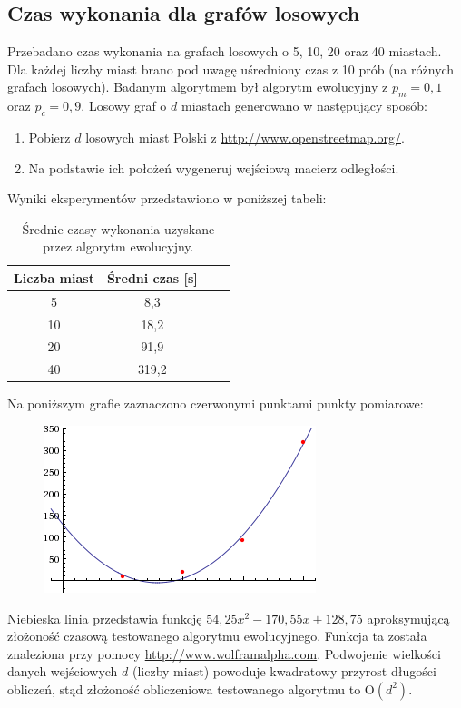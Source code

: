 \documentclass[12pt, a4paper]{article}
\begin{document}
\subsection{Czas wykonania dla grafów losowych}

Przebadano czas wykonania na grafach losowych o 5, 10, 20 oraz 40 miastach.
Dla każdej liczby miast brano pod uwagę uśredniony czas z 10 prób (na różnych grafach losowych).
Badanym algorytmem był algorytm ewolucyjny z $p_m=0,1$ oraz $p_c=0,9$.
Losowy graf o $d$ miastach generowano w następujący sposób:

\begin{enumerate}
 \item Pobierz $d$ losowych miast Polski z \url{http://www.openstreetmap.org/}.
 \item Na podstawie ich położeń wygeneruj wejściową macierz odległości.
\end{enumerate}

Wyniki eksperymentów przedstawiono w poniższej tabeli:

\begin{table}[h]
\centering
	\begin{tabular}{ | c | c | c | c | } 
		\hline
  		Liczba miast & Średni czas [s] \\
  		\hline
  		5 & 8,3 \\
  		\hline
  		10 & 18,2 \\
  		\hline
  		20 & 91,9 \\
  		\hline
  		40 & 319,2 \\
  		\hline
	\end{tabular}
\caption{Średnie czasy wykonania uzyskane przez algorytm ewolucyjny.}
\end{table}

Na poniższym grafie zaznaczono czerwonymi punktami punkty pomiarowe:

\begin{figure}[H]
\centering
  \includegraphics[width=.5\textwidth]{time.png}
\end{figure}

Niebieska linia przedstawia funkcję $54,25x^2 - 170,55x + 128,75$ aproksymującą
złożoność czasową testowanego algorytmu ewolucyjnego. Funkcja ta została znaleziona przy pomocy
\url{http://www.wolframalpha.com}. Podwojenie wielkości danych wejściowych $d$ (liczby miast) powoduje
kwadratowy przyrost długości obliczeń, stąd złożoność obliczeniowa 
testowanego algorytmu to O$(d^2)$.
\end{document}
